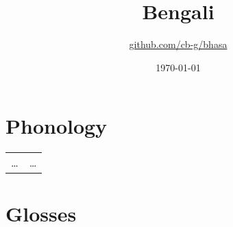 \documentclass{article}
\title{Bengali\\\ipa{["baNgla]}}
\author{\href{https://github.com/cb-g/bhasa}{github.com/cb-g/bhasa}}
\date{\today}
\begin{document}
\pagecolor{custom_bg}\color{custom_fg}
\maketitle\thispagestyle{empty}

\newpage\setcounter{page}{1}\section{Phonology}

\begin{table}[H]
  \color{custom_fg}
  \begin{tabular}{ll}
    \dots & \dots \\
  \end{tabular}
\end{table}

\newpage\section{Glosses}
\end{document}
